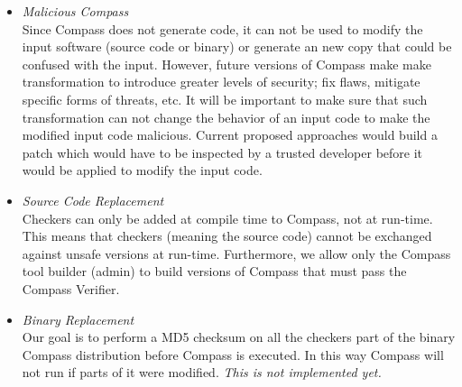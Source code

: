 \begin{itemize}
\item \emph{Malicious Compass} \\
    Since Compass does not generate code, it can not be used to modify the input software
    (source code or binary) or generate an new copy that could be confused with the input.
    However, future versions of Compass make make transformation to introduce greater
    levels of security; fix flaws, mitigate specific forms of threats, etc.  It will be
    important to make sure that such transformation can not change the behavior of an
    input code to make the modified input code malicious.  Current proposed approaches
    would build a patch which would have to be inspected by a trusted developer before
    it would be applied to modify the input code.

\item \emph{Source Code Replacement} \\ Checkers can only be added at compile time to
    Compass, not at run-time. This means that checkers (meaning the source code) cannot be
    exchanged against unsafe versions at run-time. Furthermore, we allow only the Compass
    tool builder (admin) to build versions of Compass that must pass the Compass Verifier.

\item \emph{Binary Replacement} \\ Our goal is to perform a MD5 checksum on all the checkers
    part of the binary Compass distribution before Compass is executed. In this way
    Compass will not run if parts of it were modified. {\em This is not implemented yet.}

\end{itemize} 




